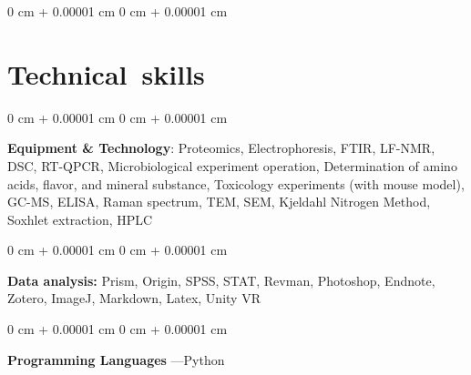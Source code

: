 \documentclass[10pt, letterpaper]{article}
\newenvironment{highlights}{
    \begin{itemize}[
        topsep=0.10 cm,
        parsep=0.10 cm,
        partopsep=0pt,
        itemsep=0pt,
        leftmargin=0 cm + 10pt
    ]
}{
    \end{itemize}
} %
\newenvironment{onecolentry}{
    \begin{adjustwidth}{
        0 cm + 0.00001 cm
    }{
        0 cm + 0.00001 cm
    }
}{
    \end{adjustwidth}
} %
\newenvironment{header}{
    \setlength{\topsep}{0pt}\par\kern\topsep\centering\linespread{1}
}{
    \par\kern\topsep
} %
\begin{document}
\begin{header}
\begin{onecolentry}
\begin{highlights}
            
            \end{highlights}
        \end{onecolentry}
 






    
    \section{\mbox{Technical skills}}



        
        \begin{onecolentry}
             \textbf{Equipment \& Technology}: Proteomics, Electrophoresis, FTIR, LF-NMR, DSC, RT-QPCR, Microbiological experiment operation, Determination of amino acids, flavor, and mineral substance, Toxicology experiments (with mouse model), GC-MS, ELISA, Raman spectrum, TEM, SEM, Kjeldahl Nitrogen Method, Soxhlet extraction, HPLC 

        \end{onecolentry}

        \vspace{0.2 cm}

        \begin{onecolentry}
           \textbf{Data analysis:} Prism, Origin, SPSS, STAT, Revman, Photoshop, Endnote, Zotero, ImageJ, Markdown, Latex, Unity VR 
        \end{onecolentry}

  \vspace{0.2 cm}

\begin{onecolentry}
     \textbf{Programming Languages }—Python 
\end{onecolentry}


    
\end{document}
